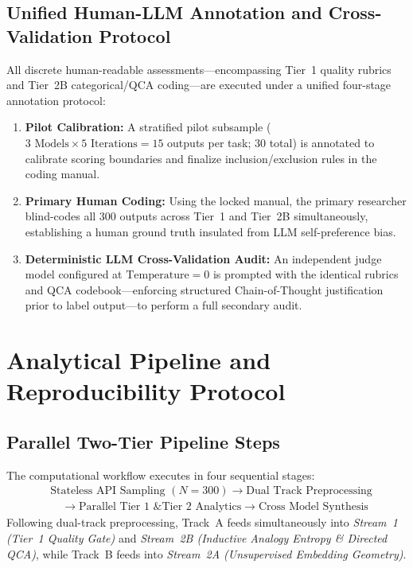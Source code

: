 \subsection{Unified Human-LLM Annotation and Cross-Validation Protocol}
All discrete human-readable assessments---encompassing Tier~1 quality rubrics and Tier~2B categorical/QCA coding---are executed under a unified four-stage annotation protocol:
\begin{enumerate}
  \item \textbf{Pilot Calibration:} A stratified pilot subsample ($3 \text{ Models} \times 5 \text{ Iterations} = 15$ outputs per task; $30$ total) is annotated to calibrate scoring boundaries and finalize inclusion/exclusion rules in the coding manual.
  \item \textbf{Primary Human Coding:} Using the locked manual, the primary researcher blind-codes all $300$ outputs across Tier~1 and Tier~2B simultaneously, establishing a human ground truth insulated from LLM self-preference bias.
  \item \textbf{Deterministic LLM Cross-Validation Audit:} An independent judge model configured at $\text{Temperature} = 0$ is prompted with the identical rubrics and QCA codebook—enforcing structured Chain-of-Thought justification prior to label output—to perform a full secondary audit.
\end{enumerate}

\section{Analytical Pipeline and Reproducibility Protocol}

\subsection{Parallel Two-Tier Pipeline Steps}
The computational workflow executes in four sequential stages:
\[
\begin{aligned}
&\text{Stateless API Sampling } (N=300) \rightarrow \text{Dual Track Preprocessing} \\
&\quad \rightarrow \text{Parallel Tier 1 \& Tier 2 Analytics} \rightarrow \text{Cross Model Synthesis}
\end{aligned}
\]
Following dual-track preprocessing, Track~A feeds simultaneously into \textit{Stream~1 (Tier~1 Quality Gate)} and \textit{Stream~2B (Inductive Analogy Entropy \& Directed QCA)}, while Track~B feeds into \textit{Stream~2A (Unsupervised Embedding Geometry)}.

